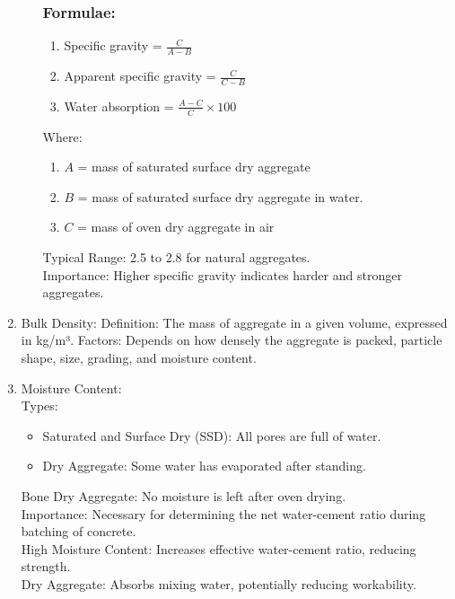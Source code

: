 \documentclass[a4paper,11pt]{book}
\begin{document}
\begin{enumerate}
\begin{itemize}
\subsubsection*{Formulae:}
\begin{enumerate}
    \item Specific gravity = \( \frac{C}{A-B} \)
    \item Apparent specific gravity = \( \frac{C}{C-B} \)
    \item Water absorption = \( \frac{A - C}{C} \times 100 \)%
\end{enumerate}
    \noindent Where:
\begin{enumerate}
    \item \( A \) = mass of saturated surface dry aggregate
    \item \( B \) = mass of saturated surface dry aggregate in water.
    \item \( C \) =  mass of oven dry aggregate in air
\end{enumerate}
   
Typical Range: 2.5 to 2.8 for natural aggregates.
\\Importance: Higher specific gravity indicates harder and stronger aggregates.
\end{itemize}
\item Bulk Density:
Definition: The mass of aggregate in a given volume, expressed in kg/m³.
Factors: Depends on how densely the aggregate is packed, particle shape, size, grading, and moisture content.

\item Moisture Content:
\\Types:
\begin{itemize}
     
\item Saturated and Surface Dry (SSD): All pores are full of water.
\item Dry Aggregate: Some water has evaporated after standing.
\end{itemize}
Bone Dry Aggregate: No moisture is left after oven drying.
\\Importance: Necessary for determining the net water-cement ratio during batching of concrete.
\\High Moisture Content: Increases effective water-cement ratio, reducing strength.
 \\Dry Aggregate: Absorbs mixing water, potentially reducing workability.


\end{enumerate}
\end{document}
